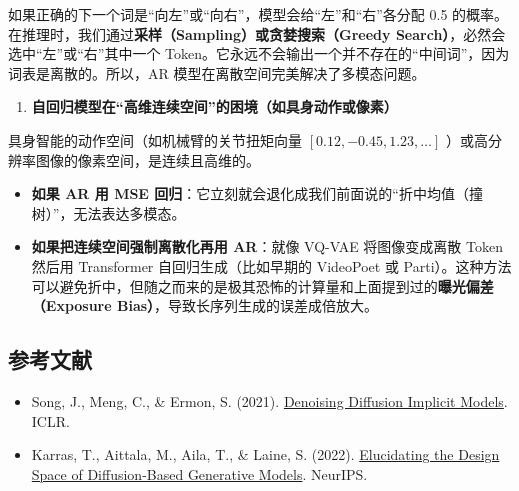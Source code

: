 如果正确的下一个词是``向左''或``向右''，模型会给``左''和``右''各分配 0.5 的概率。在推理时，我们通过\textbf{采样（Sampling）或贪婪搜索（Greedy Search）}，必然会选中``左''或``右''其中一个 Token。它永远不会输出一个并不存在的``中间词''，因为词表是离散的。所以，AR 模型在离散空间完美解决了多模态问题。

\begin{enumerate}
\def\labelenumi{\arabic{enumi}.}
\setcounter{enumi}{1}
\tightlist
\item
  \textbf{自回归模型在``高维连续空间''的困境（如具身动作或像素）}
\end{enumerate}

具身智能的动作空间（如机械臂的关节扭矩向量 \([0.12, -0.45, 1.23, \ldots]\) ）或高分辨率图像的像素空间，是连续且高维的。

\begin{itemize}
\tightlist
\item
  \textbf{如果 AR 用 MSE 回归}：它立刻就会退化成我们前面说的``折中均值（撞树）''，无法表达多模态。
\item
  \textbf{如果把连续空间强制离散化再用 AR}：就像 VQ-VAE 将图像变成离散 Token 然后用 Transformer 自回归生成（比如早期的 VideoPoet 或 Parti）。这种方法可以避免折中，但随之而来的是极其恐怖的计算量和上面提到过的\textbf{曝光偏差（Exposure Bias）}，导致长序列生成的误差成倍放大。
\end{itemize}

\FloatBarrier
{}
\hypertarget{ux53c2ux8003ux6587ux732e-132}{%
\subsection{参考文献}\label{ux53c2ux8003ux6587ux732e-132}}

\vspace{0.25em}
\begin{itemize}
\tightlist
\item
  Song, J., Meng, C., \& Ermon, S. (2021). \href{https://arxiv.org/abs/2010.02502}{Denoising Diffusion Implicit Models}. ICLR.
\item
  Karras, T., Aittala, M., Aila, T., \& Laine, S. (2022). \href{https://arxiv.org/abs/2206.00364}{Elucidating the Design Space of Diffusion-Based Generative Models}. NeurIPS.
\end{itemize}

\clearpage
